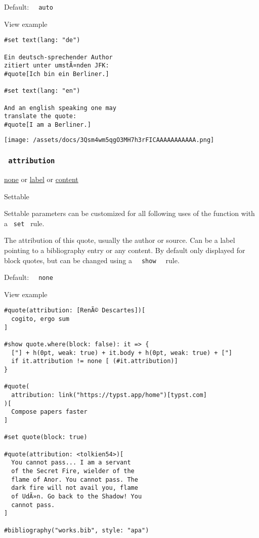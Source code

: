 Default: \texttt{\ }{\texttt{\ auto\ }}\texttt{\ }


View example

\begin{verbatim}
#set text(lang: "de")

Ein deutsch-sprechender Author
zitiert unter umstÃ¤nden JFK:
#quote[Ich bin ein Berliner.]

#set text(lang: "en")

And an english speaking one may
translate the quote:
#quote[I am a Berliner.]
\end{verbatim}

\texttt{[image: /assets/docs/3Qsm4wm5qgO3MH7h3rFICAAAAAAAAAAA.png]}

\subsubsection{\texorpdfstring{\texttt{\ attribution\ }}{ attribution }}\label{parameters-attribution}

\href{/docs/reference/foundations/none/}{none} {or}
\href{/docs/reference/foundations/label/}{label} {or}
\href{/docs/reference/foundations/content/}{content}

{{ Settable }}

\label{parameters-attribution-settable-tooltip}
Settable parameters can be customized for all following uses of the
function with a \texttt{\ set\ } rule.

The attribution of this quote, usually the author or source. Can be a
label pointing to a bibliography entry or any content. By default only
displayed for block quotes, but can be changed using a
\texttt{\ }{\texttt{\ show\ }}\texttt{\ } rule.

Default: \texttt{\ }{\texttt{\ none\ }}\texttt{\ }


View example

\begin{verbatim}
#quote(attribution: [RenÃ© Descartes])[
  cogito, ergo sum
]

#show quote.where(block: false): it => {
  ["] + h(0pt, weak: true) + it.body + h(0pt, weak: true) + ["]
  if it.attribution != none [ (#it.attribution)]
}

#quote(
  attribution: link("https://typst.app/home")[typst.com]
)[
  Compose papers faster
]

#set quote(block: true)

#quote(attribution: <tolkien54>)[
  You cannot pass... I am a servant
  of the Secret Fire, wielder of the
  flame of Anor. You cannot pass. The
  dark fire will not avail you, flame
  of UdÃ»n. Go back to the Shadow! You
  cannot pass.
]

#bibliography("works.bib", style: "apa")
\end{verbatim}

